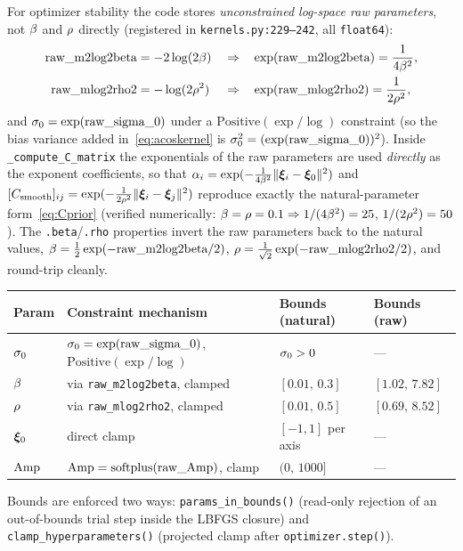 For optimizer stability the code stores \emph{unconstrained log-space raw
parameters}, not $\beta$ and $\rho$ directly (registered in
\texttt{kernels.py:229--242}, all \texttt{float64}):
\begin{equation}
\begin{aligned}
\text{raw\_m2log2beta}&=-2\log(2\beta)&&\Rightarrow&&\exp(\text{raw\_m2log2beta})=\frac{1}{4\beta^2},\\
\text{raw\_mlog2rho2}&=-\log(2\rho^2)&&\Rightarrow&&\exp(\text{raw\_mlog2rho2})=\frac{1}{2\rho^2},
\end{aligned}
\end{equation}
and $\sigma_{0}=\exp(\text{raw\_sigma\_0})$ under a $\mathrm{Positive}(\exp/\log)$
constraint (so the bias variance added in~\eqref{eq:acoskernel} is
$\sigma_{0}^2=(\exp(\text{raw\_sigma\_0}))^2$). Inside
\texttt{\_compute\_C\_matrix} the exponentials of the raw parameters are used
\emph{directly} as the exponent coefficients, so that
$\alpha_i=\exp(-\tfrac{1}{4\beta^2}\lVert\bm{\xi}_i-\bm{\xi}_{0}\rVert^2)$ and
$[C_{\mathrm{smooth}}]_{ij}=\exp(-\tfrac{1}{2\rho^2}\lVert\bm{\xi}_i-\bm{\xi}_j\rVert^2)$ reproduce
exactly the natural-parameter form~\eqref{eq:Cprior} (verified numerically:
$\beta=\rho=0.1\Rightarrow 1/(4\beta^2)=25$, $1/(2\rho^2)=50$). The
\texttt{.beta}/\texttt{.rho} properties invert the raw parameters back to the
natural values,
$\beta=\tfrac12\exp(-\text{raw\_m2log2beta}/2)$,
$\rho=\tfrac{1}{\sqrt2}\exp(-\text{raw\_mlog2rho2}/2)$, and round-trip cleanly.

\begin{table}[h]
\centering
\begin{tabular}{@{}llll@{}}
\toprule
Param & Constraint mechanism & Bounds (natural) & Bounds (raw) \\
\midrule
$\sigma_{0}$ & $\sigma_{0}=\exp(\text{raw\_sigma\_0})$, $\mathrm{Positive}(\exp/\log)$ & $\sigma_{0}>0$ & --- \\
$\beta$ & via \texttt{raw\_m2log2beta}, clamped & $[0.01,\,0.3]$ & $[1.02,\,7.82]$ \\
$\rho$ & via \texttt{raw\_mlog2rho2}, clamped & $[0.01,\,0.5]$ & $[0.69,\,8.52]$ \\
$\bm{\xi}_{0}$ & direct clamp & $[-1,1]$ per axis & --- \\
$\mathrm{Amp}$ & $\mathrm{Amp}=\mathrm{softplus}(\text{raw\_Amp})$, clamp & $(0,\,1000]$ & --- \\
\bottomrule
\end{tabular}
\end{table}

\begin{sloppypar}
Bounds are enforced two ways: \texttt{params\_in\_bounds()} (read-only rejection of
an out-of-bounds trial step inside the LBFGS closure) and
\texttt{clamp\_hyperparameters()} (projected clamp after \texttt{optimizer.step()}).
\end{sloppypar}

